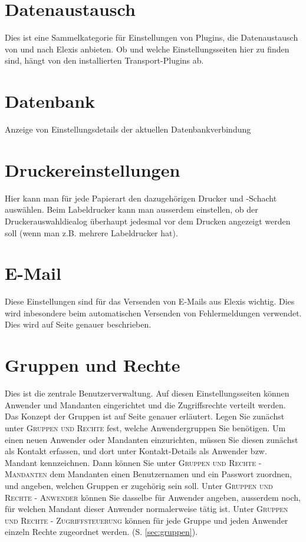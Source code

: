 \section{Datenaustausch}
Dies ist eine Sammelkategorie für Einstellungen von Plugins, die Datenaustausch von und nach Elexis anbieten. Ob und welche Einstellungsseiten hier zu finden sind, hängt von den installierten Transport-Plugins ab.
\section{Datenbank}
Anzeige von Einstellungsdetails der aktuellen Datenbankverbindung
\section{Druckereinstellungen}
Hier kann man für jede Papierart den dazugehörigen Drucker und -Schacht auswählen. Beim Labeldrucker kann man ausserdem einstellen, ob der Druckerauswahldiealog überhaupt jedesmal vor dem Drucken angezeigt werden soll (wenn man z.B. mehrere Labeldrucker hat).
\section{E-Mail}
Diese Einstellungen sind für das Versenden von E-Mails aus Elexis wichtig. Dies wird inbesondere beim automatischen Versenden von Fehlermeldungen verwendet. Dies wird auf Seite \pageref{senderrors} genauer beschrieben.

\section{Gruppen und Rechte}
Dies ist die zentrale Benutzerverwaltung. Auf diesen Einstellungsseiten können Anwender und Mandanten eingerichtet und die Zugriffsrechte verteilt werden. Das Konzept der Gruppen ist auf Seite \pageref{sec:gruppen} genauer erläutert.
Legen Sie zunächst unter \textsc{Gruppen und Rechte} fest, welche Anwendergruppen Sie benötigen.
Um einen neuen Anwender oder Mandanten einzurichten, müssen Sie diesen zunächst als \glqq Kontakt \grqq{} erfassen, und dort unter Kontakt-Details als Anwender bzw. Mandant kennzeichnen. Dann können Sie unter \textsc{Gruppen und Rechte - Mandanten} dem Mandanten einen Benutzernamen und ein Passwort zuordnen, und angeben, welchen Gruppen er zugehörig sein soll.
Unter \textsc{Gruppen und Rechte - Anwender} können Sie dasselbe für Anwender angeben, ausserdem noch, für welchen Mandant dieser Anwender normalerweise tätig ist.
Unter \textsc{Gruppen und Rechte - Zugriffsteuerung} können für jede Gruppe und jeden Anwender einzeln Rechte zugeordnet werden.  (S. \ref{sec:gruppen}).
